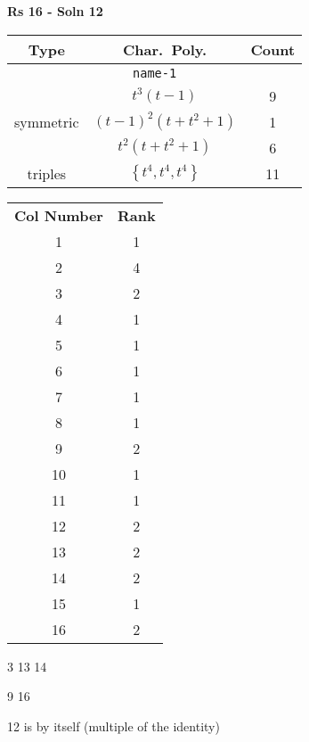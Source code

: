 \documentclass{article}
\begin{document}
    \textbf{Rs 16 - Soln 12}
    \begin{table}
    \begin{tabular}{|c|c|c|}
    \hline
    \textbf{Type} & \textbf{Char.~Poly.} & \textbf{Count} \\
    \hline \multicolumn{3}{|c|}{\texttt{name-1}} \\ \hline
    \multirow{3}{*}{symmetric}
    & $t^3(t - 1)$ & 9 \\
    & $(t - 1)^2(t + t^2 + 1)$ & 1 \\
    & $t^2(t + t^2 + 1)$ & 6 \\
    \hline
    \multirow{1}{*}{triples}
    & $\left\{t^4,t^4,t^4\right\}$ & 11 \\
    \hline
    \end{tabular}
    \end{table}
    \begin{table}
    \begin{tabular}{|c|c|}
    \hline
    \textbf{Col Number} & \textbf{Rank}\\
    1 & 1 \\ 
    2 & 4 \\ 
    3 & 2 \\ 
    4 & 1 \\ 
    5 & 1 \\ 
    6 & 1 \\ 
    7 & 1 \\ 
    8 & 1 \\ 
    9 & 2 \\ 
    10 & 1 \\ 
    11 & 1 \\ 
    12 & 2 \\ 
    13 & 2 \\ 
    14 & 2 \\ 
    15 & 1 \\ 
    16 & 2 \\ 
    \hline
    \end{tabular}
    \end{table}

    3 13 14

    9 16

    12 is by itself (multiple of the identity)
    \newpage
\end{document}
